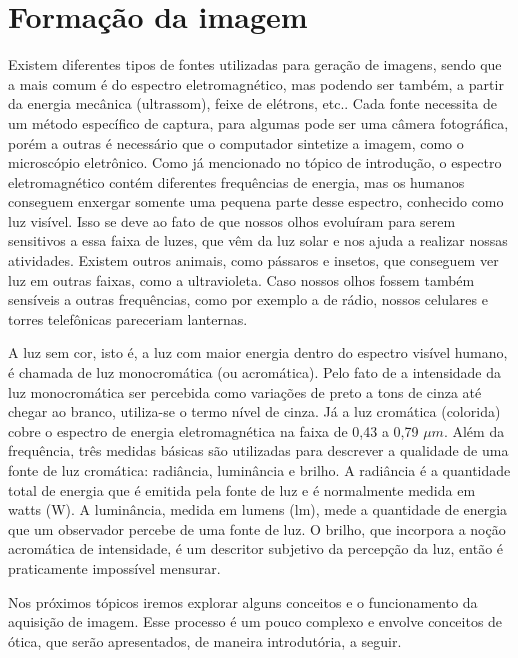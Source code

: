 \documentclass[
  brazilian,
]{book}
\begin{document}
\hypertarget{formauxe7uxe3o-da-imagem}{%
\chapter{Formação da imagem}\label{formauxe7uxe3o-da-imagem}}

Existem diferentes tipos de fontes utilizadas para geração de imagens, sendo que a mais comum é do espectro eletromagnético, mas podendo ser também, a partir da energia mecânica (ultrassom), feixe de elétrons, etc.. Cada fonte necessita de um método específico de captura, para algumas pode ser uma câmera fotográfica, porém a outras é necessário que o computador sintetize a imagem, como o microscópio eletrônico. Como já mencionado no tópico de introdução, o espectro eletromagnético contém diferentes frequências de energia, mas os humanos conseguem enxergar somente uma pequena parte desse espectro, conhecido como luz visível. Isso se deve ao fato de que nossos olhos evoluíram para serem sensitivos a essa faixa de luzes, que vêm da luz solar e nos ajuda a realizar nossas atividades. Existem outros animais, como pássaros e insetos, que conseguem ver luz em outras faixas, como a ultravioleta\autocite[p.2]{cuthill2017}. Caso nossos olhos fossem também sensíveis a outras frequências, como por exemplo a de rádio, nossos celulares e torres telefônicas pareceriam lanternas\autocite[p.8]{moeslund2012}.

A luz sem cor, isto é, a luz com maior energia dentro do espectro visível humano, é chamada de luz monocromática (ou acromática). Pelo fato de a intensidade da luz monocromática ser percebida como variações de preto a tons de cinza até chegar ao branco, utiliza-se o termo nível de cinza. Já a luz cromática (colorida) cobre o espectro de energia eletromagnética na faixa de 0,43 a 0,79 \(\mu m\). Além da frequência, três medidas básicas são utilizadas para descrever a qualidade de uma fonte de luz cromática: radiância, luminância e brilho. A radiância é a quantidade total de energia que é emitida pela fonte de luz e é normalmente medida em watts (W). A luminância, medida em lumens (lm), mede a quantidade de energia que um observador percebe de uma fonte de luz. O brilho, que incorpora a noção acromática de intensidade, é um descritor subjetivo da percepção da luz, então é praticamente impossível mensurar\autocite[p.28]{gonzalez2010}.

Nos próximos tópicos iremos explorar alguns conceitos e o funcionamento da aquisição de imagem. Esse processo é um pouco complexo e envolve conceitos de ótica, que serão apresentados, de maneira introdutória, a seguir.
\end{document}
